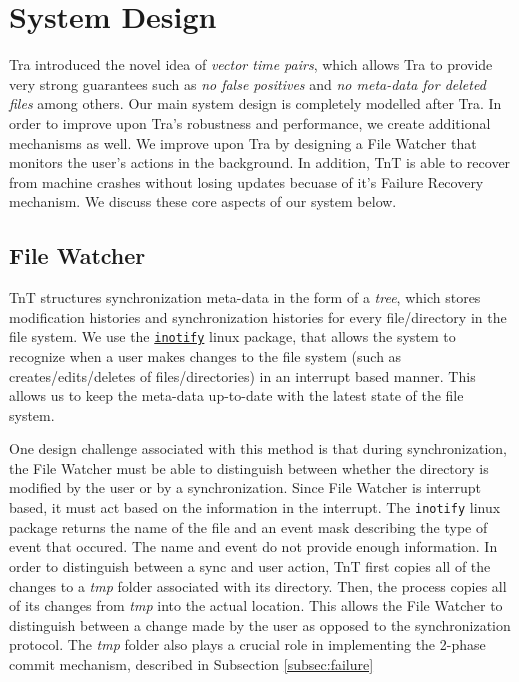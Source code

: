\section{System Design}

Tra introduced the novel idea of {\em vector time pairs}, which allows Tra to provide very strong guarantees such as {\em no false positives} and {\em no meta-data for deleted files} among others. Our main system design is completely modelled after Tra.  In order to improve upon Tra's robustness and performance, we create additional mechanisms as well.  We improve upon Tra by designing a File Watcher that monitors the user's actions in the background.  In addition, TnT is able to recover from machine crashes without losing updates becuase of it's Failure Recovery mechanism.  We discuss these core aspects of our system below.

\subsection{File Watcher}
TnT structures synchronization meta-data in the form of a {\em tree}, which stores modification histories and synchronization histories for every file/directory in the file system. We use the \href{http://godoc.org/code.google.com/p/go.exp/inotify}{\tt inotify} linux package, that allows the system to recognize when a user makes changes to the file system (such as creates/edits/deletes of files/directories) in an interrupt based manner. This allows us to keep the meta-data up-to-date with the latest state of the file system.

One design challenge associated with this method is that during synchronization, the File Watcher must be able to distinguish between whether the directory is modified by the user or by a synchronization.  Since File Watcher is interrupt based, it must act based on the information in the interrupt.  The {\tt inotify} linux package returns the name of the file and an event mask describing the type of event that occured.  The name and event do not provide enough information.  In order to distinguish between a sync and user action, TnT first copies all of the changes to a {\em tmp} folder associated with its directory.  Then, the process copies all of its changes from {\em tmp} into the actual location. This allows the File Watcher to distinguish between a change made by the user as opposed to the synchronization protocol. The {\em tmp} folder also plays a crucial role in implementing the 2-phase commit mechanism, described in Subsection \ref{subsec:failure}

